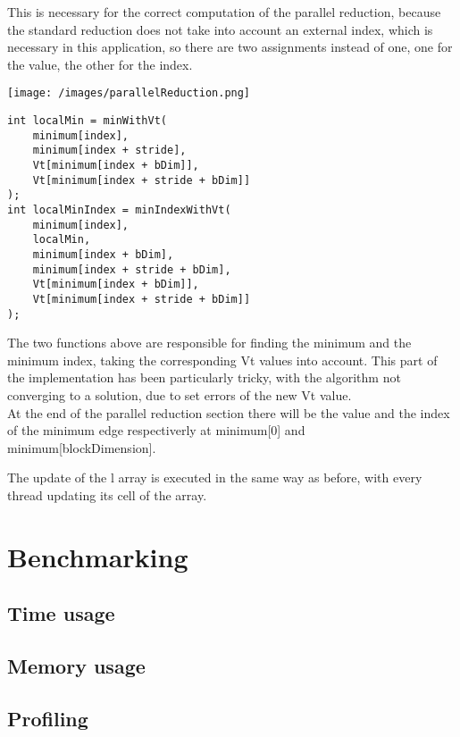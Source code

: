 \documentclass[
	a4paper, %
	12pt, %
]{class}
\begin{document}
This is necessary for the correct computation of the parallel reduction, because the standard reduction does not take into account an external index, which is necessary
in this application, so there are two assignments instead of one, one for the value, the other for the index.

\begin{center}
    \texttt{[image: /images/parallelReduction.png]}
\end{center}
\begin{verbatim}
int localMin = minWithVt(
    minimum[index],
    minimum[index + stride],
    Vt[minimum[index + bDim]],
    Vt[minimum[index + stride + bDim]]
);
int localMinIndex = minIndexWithVt(
    minimum[index],
    localMin,
    minimum[index + bDim],
    minimum[index + stride + bDim],
    Vt[minimum[index + bDim]],
    Vt[minimum[index + stride + bDim]]
);
\end{verbatim}
The two functions above are responsible for finding the minimum and the minimum index, taking the corresponding Vt values into account.
This part of the implementation has been particularly tricky, with the algorithm not converging to a solution, due to set errors of the new Vt value.\\

At the end of the parallel reduction section there will be the value and the index of the minimum edge respectiverly at minimum[0] and minimum[blockDimension].

The update of the l array is executed in the same way as before, with every thread updating its cell of the array.

\section{Benchmarking}

\subsection{Time usage}

\subsection{Memory usage}

\subsection{Profiling}

\newpage
\printbibliography %

\end{document}
